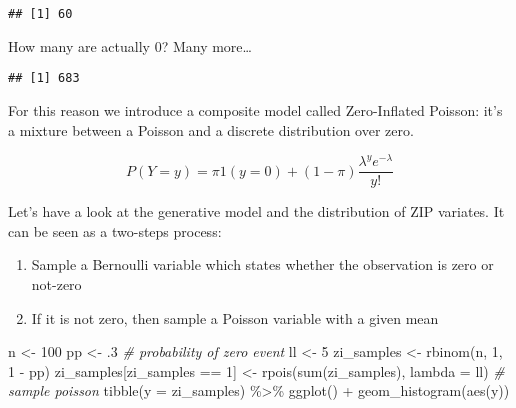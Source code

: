 \documentclass[
  oneside]{book}
\newenvironment{Shaded}{\begin{snugshade}}{\end{snugshade}}
\newcommand{\AttributeTok}[1]{\textcolor[rgb]{0.77,0.63,0.00}{#1}}
\newcommand{\CommentTok}[1]{\textcolor[rgb]{0.56,0.35,0.01}{\textit{#1}}}
\newcommand{\DecValTok}[1]{\textcolor[rgb]{0.00,0.00,0.81}{#1}}
\newcommand{\FunctionTok}[1]{\textcolor[rgb]{0.00,0.00,0.00}{#1}}
\newcommand{\NormalTok}[1]{#1}
\newcommand{\OtherTok}[1]{\textcolor[rgb]{0.56,0.35,0.01}{#1}}
\newcommand{\SpecialCharTok}[1]{\textcolor[rgb]{0.00,0.00,0.00}{#1}}
\providecommand{\tightlist}{%
  \setlength{\itemsep}{0pt}\setlength{\parskip}{0pt}}
\begin{document}
\begin{verbatim}
## [1] 60
\end{verbatim}

How many are actually 0? Many more\ldots{}

\begin{Shaded}
\end{Shaded}

\begin{verbatim}
## [1] 683
\end{verbatim}

For this reason we introduce a composite model called Zero-Inflated Poisson:
it's a mixture between a Poisson and a discrete distribution over zero.

\[
P(Y = y) = \pi \mathrm{1}(y = 0) + (1 - \pi) \frac{\lambda^{y} e^{-\lambda}}{y!}
\]

Let's have a look at the generative model and the distribution of ZIP variates.
It can be seen as a two-steps process:

\begin{enumerate}
\def\labelenumi{\arabic{enumi}.}
\tightlist
\item
  Sample a Bernoulli variable which states whether the observation is
  zero or not-zero
\item
  If it is not zero, then sample a Poisson variable with a given mean
\end{enumerate}

\begin{Shaded}
\begin{Highlighting}[]
\NormalTok{n }\OtherTok{\textless{}{-}} \DecValTok{100}
\NormalTok{pp }\OtherTok{\textless{}{-}}\NormalTok{ .}\DecValTok{3} \CommentTok{\# probability of zero event}
\NormalTok{ll }\OtherTok{\textless{}{-}} \DecValTok{5}
\NormalTok{zi\_samples }\OtherTok{\textless{}{-}} \FunctionTok{rbinom}\NormalTok{(n, }\DecValTok{1}\NormalTok{, }\DecValTok{1} \SpecialCharTok{{-}}\NormalTok{ pp)}
\NormalTok{zi\_samples[zi\_samples }\SpecialCharTok{==} \DecValTok{1}\NormalTok{] }\OtherTok{\textless{}{-}} \FunctionTok{rpois}\NormalTok{(}\FunctionTok{sum}\NormalTok{(zi\_samples), }\AttributeTok{lambda =}\NormalTok{ ll) }\CommentTok{\# sample poisson}
\FunctionTok{tibble}\NormalTok{(}\AttributeTok{y =}\NormalTok{ zi\_samples) }\SpecialCharTok{\%\textgreater{}\%}
  \FunctionTok{ggplot}\NormalTok{() }\SpecialCharTok{+}
  \FunctionTok{geom\_histogram}\NormalTok{(}\FunctionTok{aes}\NormalTok{(y))}
\end{Highlighting}
\end{Shaded}
\end{document}
